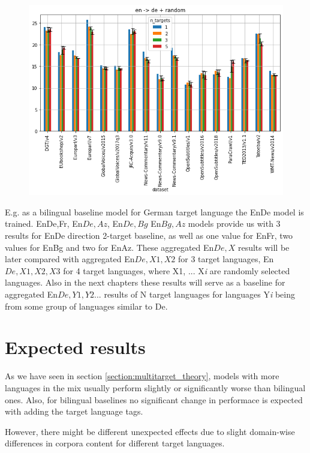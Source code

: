 \begin{figure}[h]
	\centering
	\includegraphics[width=0.9\columnwidth]{../img/random_en_de2.png}
	\label{fig:random_en_de}
\end{figure}

E.g. as a bilingual baseline model for German target language the En\to{}De
model is trained.
En\to{}De,Fr, En\to{}${De,Az}$, En\to{}${De,Bg}$ En\to{}${Bg,Az}$ models
provide us with 3 results for En\to{}De direction 2-target baseline, as well
as one value for En\to{}Fr, two values for En\to{}Bg and two for En\to{}Az.
These aggregated En\to{}${De,X}$ results will be later compared with
aggregated En\to{}${De,X1,X2}$ for 3 target languages,
En\to{}${De,X1,X2,X3}$ for 4 target languages, where X1, ... X\textit{i} are
randomly selected languages.
Also in the next chapters these results will serve as a baseline for
aggregated En\to{}${De,Y1,Y2...}$ results of N target languages for languages
Y\textit{i} being from some group of languages similar to De.

\section{Expected results}

As we have seen in section \ref{section:multitarget_theory}, models with more languages
in the mix usually perform slightly or significantly worse than bilingual ones.
Also, for bilingual baselines no significant change in performace is expected with adding
the target language tags.

However, there might be different unexpected effects due to slight domain-wise differences
in corpora content for different target languages.

